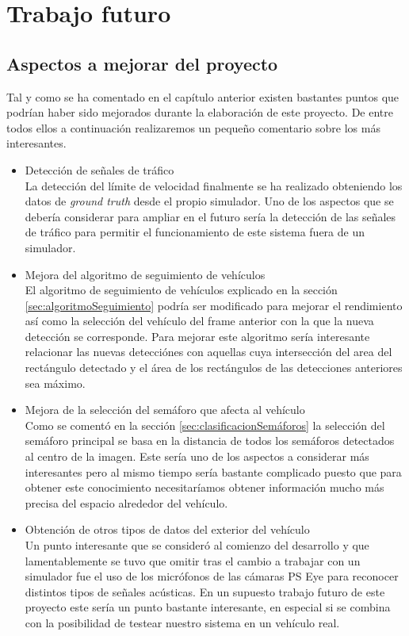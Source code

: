 \chapter{Trabajo futuro}\label{capTrabajoFuturo}

\section{Aspectos a mejorar del proyecto}
Tal y como se ha comentado en el capítulo anterior existen bastantes puntos que podrían haber sido mejorados durante la elaboración de este proyecto.
De entre todos ellos a continuación realizaremos un pequeño comentario sobre los más interesantes.

\begin{itemize}
    \item Detección de señales de tráfico\\
        La detección del límite de velocidad finalmente se ha realizado obteniendo los datos de \textit{ground truth} desde el propio simulador. Uno de los aspectos que se debería considerar para ampliar en el futuro sería la detección de las señales de tráfico para permitir el funcionamiento de este sistema fuera de un simulador.

    \item Mejora del algoritmo de seguimiento de vehículos\\
        El algoritmo de seguimiento de vehículos explicado en la sección \ref{sec:algoritmoSeguimiento} podría ser modificado para mejorar el rendimiento así como la selección del vehículo del frame anterior con la que la nueva detección se corresponde.
        Para mejorar este algoritmo sería interesante relacionar las nuevas detecciónes con aquellas cuya intersección del area del rectángulo detectado y el área de los rectángulos de las detecciones anteriores sea máximo.

    \item Mejora de la selección del semáforo que afecta al vehículo\\
        Como se comentó en la sección \ref{sec:clasificacionSemáforos} la selección del semáforo principal se basa en la distancia de todos los semáforos detectados al centro de la imagen.
        Este sería uno de los aspectos a considerar más interesantes pero al mismo tiempo sería bastante complicado puesto que para obtener este conocimiento necesitaríamos obtener información mucho más precisa del espacio alrededor del vehículo.

    \item Obtención de otros tipos de datos del exterior del vehículo\\
        Un punto interesante que se consideró al comienzo del desarrollo y que lamentablemente se tuvo que omitir tras el cambio a trabajar con un simulador fue el uso de los micrófonos de las cámaras PS Eye para reconocer distintos tipos de señales acústicas.
        En un supuesto trabajo futuro de este proyecto este sería un punto bastante interesante, en especial si se combina con la posibilidad de testear nuestro sistema en un vehículo real.
\end{itemize}


